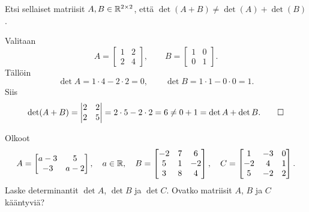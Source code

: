 \documentclass[11pt,a4paper]{amsart}
\begin{document}
\begin{exercise}
  Etsi sellaiset matriisit \(A,B\in\mathbb{R}^{2\times 2}\), että
  \(\det(A+B)\ne\det(A)+\det(B)\).
\end{exercise}

\begin{solution}
  Valitaan
  \[
    A=
    \begin{bmatrix}
      1 & 2 \\
      2 & 4
    \end{bmatrix},\qquad
    B=
    \begin{bmatrix}
      1 & 0 \\
      0 & 1
    \end{bmatrix}.
  \]
  Tällöin
  \[
    \det A=1\cdot 4-2\cdot 2=0,\qquad
    \det B=1\cdot 1-0\cdot 0=1.
  \]
  Siis
  \[
    \det(A+B)=
    \begin{vmatrix}
      2 & 2 \\
      2 & 5
    \end{vmatrix}
    =2\cdot 5-2\cdot 2=6\ne 0+1=\det A+\det B.\qedhere
  \]
\end{solution}

\begin{exercise}
  Olkoot
  \[
    A=
    \begin{bmatrix}
      a-3 & 5 \\
      -3 & a-2
    \end{bmatrix},\quad a\in\mathbb{R},\quad
    B=
    \begin{bmatrix}
      -2 & 7 & 6 \\
      5 & 1 & -2 \\
      3 & 8 & 4
    \end{bmatrix},\quad
    C=
    \begin{bmatrix}
      1 & -3 & 0 \\
      -2 & 4 & 1 \\
      5 & -2 & 2
    \end{bmatrix}.
  \]
  Laske determinantit \(\det A\), \(\det B\) ja \(\det C\).
  Ovatko matriisit \(A\), \(B\) ja \(C\) kääntyviä?
\end{exercise}
\end{document}
